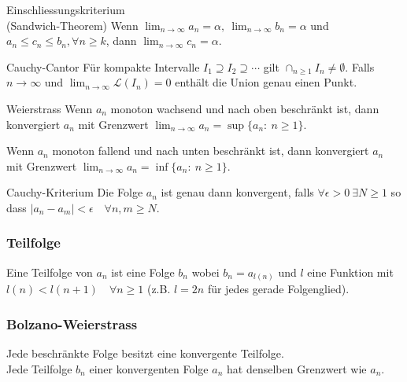 \documentclass[a4paper,10pt]{article}
\def\limn{\lim_{n\to \infty}}
\begin{document}
\begin{mainbox}{Einschliessungskriterium \\ (Sandwich-Theorem)}
Wenn $\limn a_n = \alpha, \ \limn b_n = \alpha$ und $a_n \le c_n \le b_n, \forall n \ge k$, dann $\limn c_n = \alpha$.
\end{mainbox}

\begin{subbox}{Cauchy-Cantor}
  Für kompakte Intervalle $I_1 \supseteq I_2 \supseteq \cdots$ gilt $\cap_{n \geq 1} I_n \neq \emptyset$. Falls $n \to \infty$ und $\limn \mathcal{L}(I_n) = 0$ enthält die Union genau einen Punkt.
\end{subbox}

\begin{mainbox}{Weierstrass}
Wenn $a_n$ monoton wachsend und nach oben beschränkt ist, dann konvergiert $a_n$ mit Grenzwert $\limn a_n = \sup \{a_n : \ n \ge 1\}$.

Wenn $a_n$ monoton fallend und nach unten beschränkt ist, dann konvergiert $a_n$ mit Grenzwert $\limn a_n = \inf \{a_n : \ n \ge 1\}$.
\end{mainbox}

\begin{mainbox}{Cauchy-Kriterium}
Die Folge $a_n$ ist genau dann konvergent, falls $\forall \epsilon > 0 \ \exists N \ge 1$ so dass $| a_n - a_m | < \epsilon \quad \forall n,m \ge N$.
\end{mainbox}

\subsubsection{Teilfolge}
Eine Teilfolge von $a_n$ ist eine Folge $b_n$ wobei $b_n = a_{l(n)}$ und $l$ eine Funktion mit $l(n) < l(n+1) \quad \forall n \ge 1$ (z.B. $l = 2n$ für jedes gerade Folgenglied). 

\subsubsection{Bolzano-Weierstrass}
Jede beschränkte Folge besitzt eine konvergente Teilfolge.\\
Jede Teilfolge $b_n$ einer konvergenten Folge $a_n$ hat denselben Grenzwert wie $a_n$.
\end{document}
